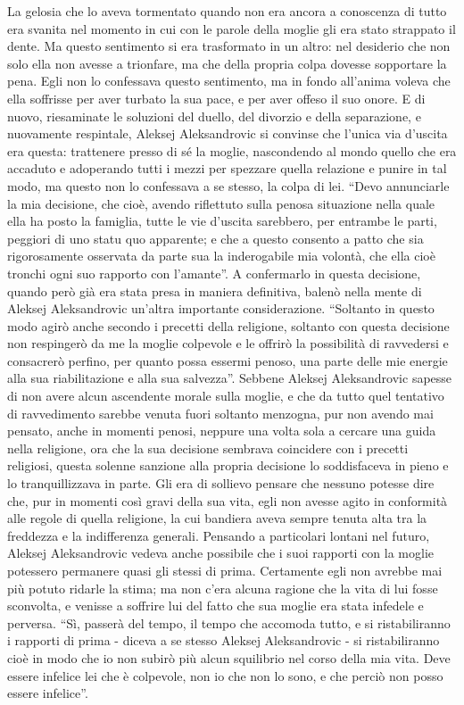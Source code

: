 La gelosia che lo aveva tormentato quando non era ancora a conoscenza di tutto era svanita nel momento in cui con le parole della moglie gli era stato strappato il dente. Ma questo sentimento si era trasformato in un altro: nel desiderio che non solo ella non avesse a trionfare, ma che della propria colpa dovesse sopportare la pena. Egli non lo confessava questo sentimento, ma in fondo all'anima voleva che ella soffrisse per aver turbato la sua pace, e per aver offeso il suo onore. E di nuovo, riesaminate le soluzioni del duello, del divorzio e della separazione, e nuovamente respintale, Aleksej Aleksandrovic si convinse che l'unica via d'uscita era questa: trattenere presso di sé la moglie, nascondendo al mondo quello che era accaduto e adoperando tutti i mezzi per spezzare quella relazione e punire in tal modo, ma questo non lo confessava a se stesso, la colpa di lei. ``Devo annunciarle la mia decisione, che cioè, avendo riflettuto sulla penosa situazione nella quale ella ha posto la famiglia, tutte le vie d'uscita sarebbero, per entrambe le parti, peggiori di uno statu quo apparente; e che a questo consento a patto che sia rigorosamente osservata da parte sua la inderogabile mia volontà, che ella cioè tronchi ogni suo rapporto con l'amante''. A confermarlo in questa decisione, quando però già era stata presa in maniera definitiva, balenò nella mente di Aleksej Aleksandrovic un'altra importante considerazione. ``Soltanto in questo modo agirò anche secondo i precetti della religione, soltanto con questa decisione non respingerò da me la moglie colpevole e le offrirò la possibilità di ravvedersi e consacrerò perfino, per quanto possa essermi penoso, una parte delle mie energie alla sua riabilitazione e alla sua salvezza''. Sebbene Aleksej Aleksandrovic sapesse di non avere alcun ascendente morale sulla moglie, e che da tutto quel tentativo di ravvedimento sarebbe venuta fuori soltanto menzogna, pur non avendo mai pensato, anche in momenti penosi, neppure una volta sola a cercare una guida nella religione, ora che la sua decisione sembrava coincidere con i precetti religiosi, questa solenne sanzione alla propria decisione lo soddisfaceva in pieno e lo tranquillizzava in parte. Gli era di sollievo pensare che nessuno potesse dire che, pur in momenti così gravi della sua vita, egli non avesse agito in conformità alle regole di quella religione, la cui bandiera aveva sempre tenuta alta tra la freddezza e la indifferenza generali. Pensando a particolari lontani nel futuro, Aleksej Aleksandrovic vedeva anche possibile che i suoi rapporti con la moglie potessero permanere quasi gli stessi di prima. Certamente egli non avrebbe mai più potuto ridarle la stima; ma non c'era alcuna ragione che la vita di lui fosse sconvolta, e venisse a soffrire lui del fatto che sua moglie era stata infedele e perversa. ``Sì, passerà del tempo, il tempo che accomoda tutto, e si ristabiliranno i rapporti di prima - diceva a se stesso Aleksej Aleksandrovic - si ristabiliranno cioè in modo che io non subirò più alcun squilibrio nel corso della mia vita. Deve essere infelice lei che è colpevole, non io che non lo sono, e che perciò non posso essere infelice''. 

